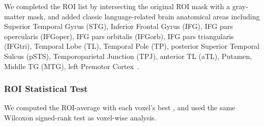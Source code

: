 We completed the ROI list by intersecting the original ROI mask with a gray-matter mask, and added classic language-related brain anatomical areas including Superior Temporal Gyrus (STG), Inferior Frontal Gyrus (IFG), IFG pars opercularis (IFGoper), IFG pars orbitalis (IFGorb), IFG pars triangularis (IFGtri), Temporal Lobe (TL), Temporal Pole (TP), posterior Superior Temporal Sulcus (pSTS), Temporoparietal Junction (TPJ), anterior TL (aTL), Putamen, Middle TG (MTG), left Premotor Cortex~\parencite{pallierCorticalRepresentationConstituent2011}. 

\subsubsection{ROI Statistical Test}

We computed the ROI-average  with each voxel's best , and used the same Wilcoxon signed-rank test as voxel-wise analysis.